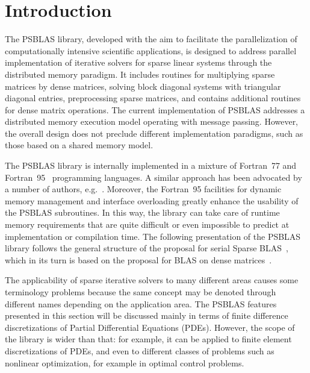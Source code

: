 \section{Introduction}

The PSBLAS library, developed with the aim to facilitate the
parallelization of computationally intensive scientific applications,
is designed to address parallel implementation of iterative solvers
for sparse linear systems through the distributed memory paradigm.  It
includes routines for multiplying sparse matrices by dense matrices,
solving block diagonal systems with triangular diagonal entries,
preprocessing sparse matrices, and contains additional routines for
dense matrix operations.  The current implementation of PSBLAS
addresses a distributed memory execution model operating with message
passing. However, the overall design does not preclude different
implementation paradigms, such as those based on a shared memory
model.

The PSBLAS library is internally implemented in a mixture of
Fortran~77 and Fortran~95~\cite{metcalf} programming languages. A
similar approach has been advocated by a number of authors,
e.g.~\cite{machiels}.  Moreover, the Fortran~95 facilities for dynamic
memory management and interface overloading greatly enhance the usability of the PSBLAS
subroutines. In this way, the library can take care of runtime memory
requirements that are quite difficult or even impossible to predict at
implementation or compilation time.  The following presentation of the
PSBLAS library follows the general structure of the proposal for
serial Sparse BLAS~\cite{sblas97}, which in its turn is based on the
proposal for BLAS on dense matrices~\cite{BLAS1,BLAS2,BLAS3}.

The applicability of sparse iterative solvers to many different areas
causes some terminology problems because the same concept may be
denoted through different names depending on the application area. The
PSBLAS features presented in this section will be discussed mainly in terms of finite
difference discretizations of Partial Differential Equations (PDEs).
However, the scope of the library is wider than that: for example, it
can be applied to finite element discretizations of PDEs, and even to
different classes of problems such as nonlinear optimization, for
example in optimal control problems.

